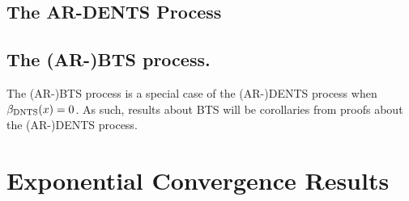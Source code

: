     \subsection{The AR-DENTS Process}
            








    \subsection{The (AR-)BTS process.}

        The (AR-)BTS process is a special case of the (AR-)DENTS process when ${\beta_{{\textnormal{DNTS}}}}(x)=0$. As such, results about BTS will be corollaries from proofs about the (AR-)DENTS process.
















































\section{Exponential Convergence Results}
\label{appsec:exp}


